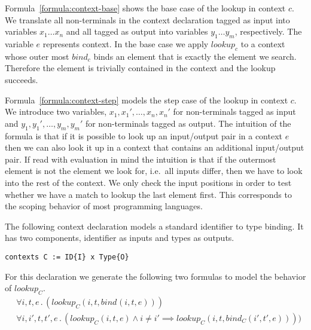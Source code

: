 Formula~\ref{formula:context-base} shows the base case of the lookup
in context $c$. We translate all non-terminals in the context
declaration tagged as input into variables $x_1 \dots x_n$ and all
tagged as output into variables $y_1 \dots y_m$, respectively. The
variable $e$ represents context. In the base case we apply $lookup_c$
to a context whose outer most $bind_c$ binds an element that is
exactly the element we search. Therefore the element is trivially
contained in the context and the lookup succeeds.

Formula~\ref{formula:context-step} models the step case of the lookup
in context $c$. We introduce two variables, $x_1,x_1', \dots,
x_n,x_n'$ for non-terminals tagged as input and $y_1,y_1', \dots,
y_m,y_m'$ for non-terminals tagged as output. The intuition of the
formula is that if it is possible to look up an input/output pair in a
context $e$ then we can also look it up in a context that contains an
additional input/output pair. If read with evaluation in mind the
intuition is that if the outermost element is not the element we look
for, i.e.\ all inputs differ, then we have to look into the rest of
the context. We only check the input positions in order to test
whether we have a match to lookup the last element first. This
corresponds to the scoping behavior of most programming languages.

\begin{example}
  The following context declaration models a standard identifier to
  type binding. It has two components, identifier as inputs and types
  as outputs.
\begin{lstlisting}[language=sltc]
contexts C := ID{I} x Type{O}
\end{lstlisting}
  For this declaration we generate the following two formulas to model
  the behavior of $lookup_{C}$.
  \begin{align}
    &\forall i, t, e \,.\, (lookup_{C}(i, t, bind_{}(i, t,
    e))) \\
    &\forall i,i',t,t',e \,.\, (lookup_{C}(i, t, e) \land i \neq
    i' \implies lookup_{C}(i, t, bind_{C}(i', t', e))))
  \end{align}
\label{ex:context-formulas}
\end{example}

